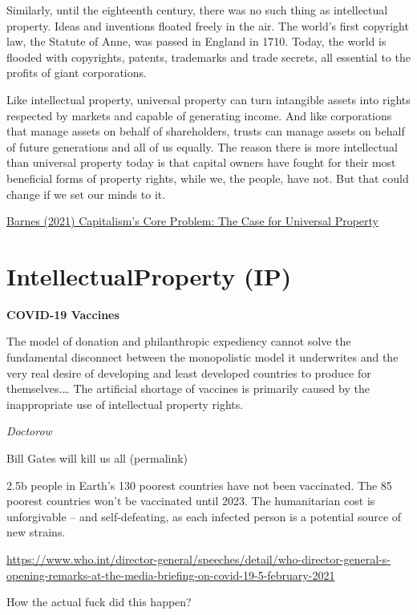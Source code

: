 \documentclass[
]{book}
\begin{document}
Similarly, until the eighteenth century, there was no such thing as intellectual property. Ideas and inven­tions floated freely in the air. The world's first copyright law, the Statute of Anne, was passed in England in 1710. Today, the world is flooded with copyrights, patents, trademarks and trade secrets, all essential to the profits of giant corporations.

Like intellectual property, universal property can turn intangible assets into rights respected by markets and capable of generating income. And like corporations that manage assets on behalf of share­­holders, trusts can manage assets on behalf of future genera­tions and all of us equally. The rea­son there is more intellectual than universal property today is that capital o­wners have fought for their most beneficial forms of property rights, while we, the people, have not. But that could change if we set our minds to it.

\href{https://evonomics.com/a-new-capitalism-the-case-for-universal-property/}{Barnes (2021) Capitalism's Core Problem: The Case for Universal Property}

\hypertarget{intellectualproperty-ip}{%
\section{IntellectualProperty (IP)}\label{intellectualproperty-ip}}

\textbf{COVID-19 Vaccines}

The model of donation and philanthropic expediency cannot solve the fundamental disconnect between the monopolistic model it underwrites and the very real desire of developing and least developed countries to produce for themselves.\ldots{} The artificial shortage of vaccines is primarily caused by the inappropriate use of intellectual property rights.

\emph{Doctorow}

Bill Gates will kill us all (permalink)

2.5b people in Earth's 130 poorest countries have not been vaccinated. The 85 poorest countries won't be vaccinated until 2023. The humanitarian cost is unforgivable -- and self-defeating, as each infected person is a potential source of new strains.

\url{https://www.who.int/director-general/speeches/detail/who-director-general-s-opening-remarks-at-the-media-briefing-on-covid-19-5-february-2021}

How the actual fuck did this happen?
\end{document}
